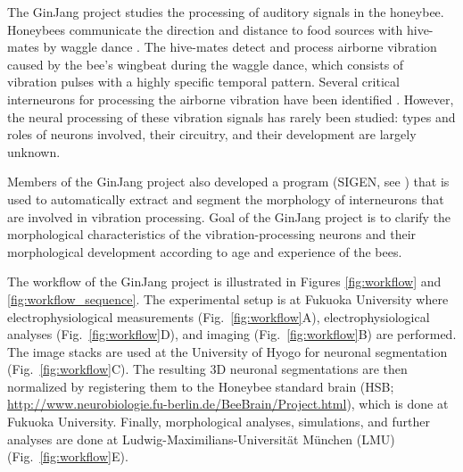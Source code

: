 \documentclass{frontiersSCNS} %
\begin{document}
The GinJang project studies the processing of auditory signals in the honeybee.
Honeybees communicate the direction and distance to food sources with
hive-mates by waggle dance \citep{Frisch1967}. The hive-mates detect and
process airborne vibration caused by the bee's wingbeat during the waggle
dance, which consists of vibration pulses with a highly specific temporal
pattern.  Several critical interneurons for processing the airborne vibration
have been identified \citep{Ai2007, Ai2009, Ai2010, Ai2012, Ai2013}. However,
the neural processing of these vibration signals has rarely been studied: types
and roles of neurons involved, their circuitry, and their development are
largely unknown.

Members of the GinJang project also developed a program (SIGEN, see
\citet{Minemoto}) that is used to automatically extract and segment the
morphology of interneurons that are involved in vibration processing. Goal
of the GinJang project is to clarify the morphological characteristics of the
vibration-processing neurons and their morphological development according to
age and experience of the bees.

The workflow of the GinJang project is illustrated in Figures
\ref{fig:workflow} and \ref{fig:workflow_sequence}.
The experimental setup
is at Fukuoka University where electrophysiological
measurements (Fig.~\ref{fig:workflow}A), electrophysiological analyses
(Fig.~\ref{fig:workflow}D), and imaging (Fig.~\ref{fig:workflow}B) are
performed. The image stacks are used at the University of Hyogo for
neuronal segmentation (Fig.~\ref{fig:workflow}C). The resulting 3D neuronal
segmentations are then normalized by registering them to the Honeybee standard
brain (HSB; \url{http://www.neurobiologie.fu-berlin.de/BeeBrain/Project.html}), which
is done at Fukuoka University. Finally, morphological analyses, simulations,
and further analyses are done at Ludwig-Maximilians-Universität München (LMU)
(Fig.~\ref{fig:workflow}E).
\end{document}
